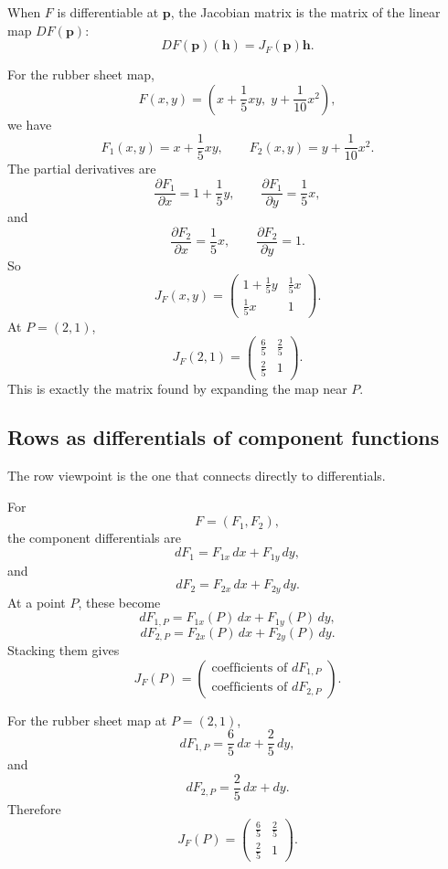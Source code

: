 When \(F\) is differentiable at \(\mathbf p\), the Jacobian matrix is the matrix of the
linear map \(DF(\mathbf p)\):
\[
\boxed{
    DF(\mathbf p)(\mathbf h)=J_F(\mathbf p)\mathbf h.
}
\]

For the rubber sheet map,
\[
    F(x,y)=
    \left(
        x+\frac15xy,\;
        y+\frac1{10}x^2
    \right),
\]
we have
\[
    F_1(x,y)=x+\frac15xy,
    \qquad
    F_2(x,y)=y+\frac1{10}x^2.
\]
The partial derivatives are
\[
    \frac{\partial F_1}{\partial x}=1+\frac15y,
    \qquad
    \frac{\partial F_1}{\partial y}=\frac15x,
\]
and
\[
    \frac{\partial F_2}{\partial x}=\frac15x,
    \qquad
    \frac{\partial F_2}{\partial y}=1.
\]
So
\[
\boxed{
    J_F(x,y)
    =
    \begin{pmatrix}
        1+\frac15y & \frac15x\\[1mm]
        \frac15x & 1
    \end{pmatrix}.
}
\]
At \(P=(2,1)\),
\[
\boxed{
    J_F(2,1)
    =
    \begin{pmatrix}
        \frac65 & \frac25\\[1mm]
        \frac25 & 1
    \end{pmatrix}.
}
\]
This is exactly the matrix found by expanding the map near \(P\).

\subsection{Rows as differentials of component functions}

The row viewpoint is the one that connects directly to differentials.

For
\[
    F=(F_1,F_2),
\]
the component differentials are
\[
    dF_1=F_{1x}\,dx+F_{1y}\,dy,
\]
and
\[
    dF_2=F_{2x}\,dx+F_{2y}\,dy.
\]
At a point \(P\), these become
\[
    dF_{1,P}=F_{1x}(P)\,dx+F_{1y}(P)\,dy,
\]
\[
    dF_{2,P}=F_{2x}(P)\,dx+F_{2y}(P)\,dy.
\]
Stacking them gives
\[
\boxed{
    J_F(P)
    =
    \begin{pmatrix}
        \text{coefficients of }dF_{1,P}\\
        \text{coefficients of }dF_{2,P}
    \end{pmatrix}.
}
\]

For the rubber sheet map at \(P=(2,1)\),
\[
    dF_{1,P}=\frac65\,dx+\frac25\,dy,
\]
and
\[
    dF_{2,P}=\frac25\,dx+dy.
\]
Therefore
\[
    J_F(P)
    =
    \begin{pmatrix}
        \frac65 & \frac25\\[1mm]
        \frac25 & 1
    \end{pmatrix}.
\]

